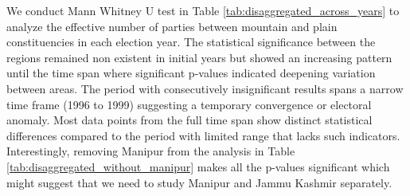     \begin{table}[htbp]
    \centering
    \caption{Lok Sabha: Year-wise Comparison Between Mountain and Plain Constituencies without Manipur}
    \label{tab:disaggregated_without_manipur}
    \end{table}
    \begin{sloppypar}
    We conduct Mann Whitney U test  in Table \ref{tab:disaggregated_across_years} to analyze the effective number of parties between mountain and plain constituencies in each election year. The statistical significance between the regions remained non existent in initial years but showed an increasing pattern until the time span where significant p-values indicated deepening variation between areas. The  period with consecutively insignificant results spans a narrow time frame (1996 to 1999) suggesting a temporary convergence or electoral anomaly.  Most data points from the full time span show distinct statistical differences compared to the period with limited range that lacks such indicators. Interestingly, removing Manipur from the analysis in Table \ref{tab:disaggregated_without_manipur} makes all the p-values significant which might suggest that we need to study Manipur and Jammu Kashmir separately. 
    \end{sloppypar}
